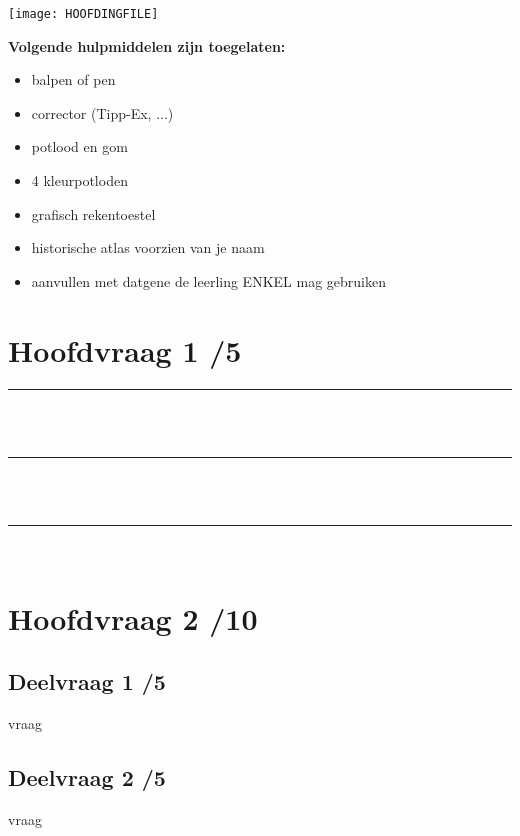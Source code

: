 \documentclass[a4paper,12pt]{article}
\begin{document}
	\texttt{[image: HOOFDINGFILE]}

	{\bf Volgende hulpmiddelen zijn toegelaten:}
	\begin{itemize}
		\item balpen of pen
		\item corrector (Tipp-Ex, ...)
		\item potlood en gom
		\item 4 kleurpotloden
		\item grafisch rekentoestel
		\item historische atlas voorzien van je naam
		\item aanvullen met datgene de leerling ENKEL mag gebruiken
	\end{itemize}

	\section{Hoofdvraag 1 \hfill /5}

		\rule{\textwidth}{0.01cm} \\
		\vspace{0.2cm} \\
		\rule{\textwidth}{0.01cm} \\
		\vspace{0.2cm} \\
		\rule{\textwidth}{0.01cm} \\

	\section{Hoofdvraag 2 \hfill /10}

		\subsection{Deelvraag 1 \hfill /5}

			vraag

		\subsection{Deelvraag 2 \hfill /5}

			vraag
\end{document}
